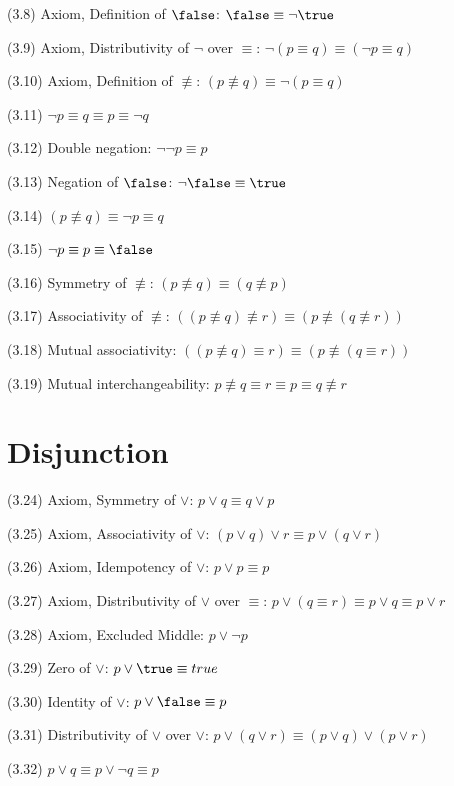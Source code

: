 \documentclass[a4paper,10pt]{article}
\newenvironment{theoremlist}{
\begin{description}
  \setlength{\itemsep}{1.5pt}
  \setlength{\parskip}{0pt}
  \setlength{\parsep}{0pt}
}{\end{description}}
\begin{document}
\begin{theoremlist}
\item[(3.8) Axiom, Definition of $\false$:] 					$ \false \equiv \lnot \true $
\item[(3.9) Axiom, Distributivity of $\lnot$ over $\equiv$:]			$ \lnot (p \equiv q) \equiv (\lnot p \equiv q) $
\item[(3.10) Axiom, Definition of $\nequiv$:]					$ (p \nequiv q) \equiv \lnot (p \equiv q) $
\item[(3.11)] 									$ \lnot p \equiv q \equiv p \equiv \lnot q $
\item[(3.12) Double negation:]							$ \lnot\lnot p \equiv p $
\item[(3.13) Negation of $\false$:]						$ \lnot \false \equiv \true $
\item[(3.14)]									$ (p \nequiv q) \equiv \lnot p \equiv q $
\item[(3.15)] 									$ \lnot p \equiv p \equiv \false $
\item[(3.16) Symmetry of $\nequiv$:]						$ (p \nequiv q) \equiv (q \nequiv p) $
\item[(3.17) Associativity of $\nequiv$:]					$ ((p \nequiv q) \nequiv r) \equiv (p \nequiv (q \nequiv r)) $
\item[(3.18) Mutual associativity:]						$ ((p \nequiv q) \equiv r) \equiv (p \nequiv (q \equiv r)) $
\item[(3.19) Mutual interchangeability:]					$ p \nequiv q \equiv r \equiv p \equiv q \nequiv r $
\end{theoremlist}



\section{Disjunction}

\begin{theoremlist}
\item[(3.24) Axiom, Symmetry of $\lor$:] 					$ p \lor q \equiv q \lor p $
\item[(3.25) Axiom, Associativity of $\lor$:]					$ (p \lor q) \lor r \equiv p \lor (q \lor r) $ 
\item[(3.26) Axiom, Idempotency of $\lor$:]					$ p \lor p \equiv p $
\item[(3.27) Axiom, Distributivity of $\lor$ over $\equiv$:]			$ p \lor (q \equiv r) \equiv p \lor q \equiv p \lor r $
\item[(3.28) Axiom, Excluded Middle:]						$ p \lor \lnot p $
\item[(3.29) Zero of $\lor$:]							$ p \lor \true \equiv true $
\item[(3.30) Identity of $\lor$:]						$ p \lor \false \equiv p $
\item[(3.31) Distributivity of $\lor$ over $\lor$:]				$ p \lor (q \lor r) \equiv (p \lor q) \lor (p \lor r) $
\item[(3.32)]									$ p \lor q \equiv p \lor \lnot q \equiv p $
\end{theoremlist}
\end{document}
